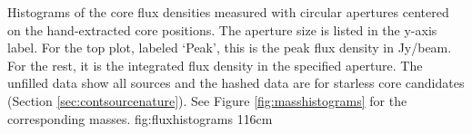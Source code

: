 \documentclass{aa}
\begin{document}
% 



{Histograms of the core flux densities measured with circular apertures centered
on the hand-extracted core positions.  The aperture size is listed 
in the y-axis label.  For the top plot, labeled `Peak', this is the peak
flux density in Jy/beam.  For the rest, it is the integrated flux density
in the specified aperture.  The unfilled data show all sources and the hashed
data are for starless core candidates (Section \ref{sec:contsourcenature}).
See Figure \ref{fig:masshistograms} for the corresponding masses.}
{fig:fluxhistograms}
{1}{16cm}



\end{document}
